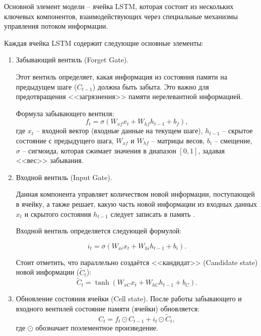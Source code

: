 \documentclass[bachelor, och, coursework]{SCWorks}
\begin{document}
  Основной элемент модели -- ячейка LSTM, которая состоит из нескольких ключевых компонентов, взаимодействующих через специальные механизмы управления 
  потоком информации.

  Каждая ячейка LSTM содержит следующие основные элементы:  

  \begin{enumerate}
    
    \item Забывающий вентиль (Forget Gate).
    
    Этот вентиль определяет, какая информация из состояния памяти на предыдущем шаге ($C_{t-1}$) должна быть забыта.  
    Это важно для предотвращения <<загрязнения>> памяти нерелевантной информацией.  
    
    Формула забывающего вентиля:  
    \begin{equation}      
        f_t = \sigma(W_{xf}x_t + W_{hf}h_{t-1} + b_f),
    \end{equation}
     где $x_t$ -- входной вектор (входные данные на текущем шаге), $h_{t-1}$ -- скрытое состояние с предыдущего шага, $W_{xf}$ и $W_{hf}$ -- матрицы весов,
     $b_i$ -- смещение, $\sigma$ -- сигмоида, которая сжимает значения в диапазон $[0, 1]$, задавая <<вес>> забывания.

    \item Входной вентиль (Input Gate).
    
    Данная компонента управляет количеством новой информации, поступающей в ячейку, а также решает, 
    какую часть новой информации из входных данных \(x_t\) и скрытого состояния \(h_{t-1}\) 
    следует записать в память \cite{lstm2}.

    Входной вентиль определяется следующей формулой:  

    \begin{equation}
        i_t = \sigma(W_{xi}x_t + W_{hi}h_{t-1} + b_i).
    \end{equation}
    
    Стоит отметить, что параллельно создаётся <<кандидат>> (Candidate state) новой информации (\(\tilde{C}_t\)):  
    \begin{equation}
      \tilde{C}_t = \tanh(W_{xC}x_t + W_{hC}h_{t-1} + b_C).      
    \end{equation}

    \item Обновление состояния ячейки (Cell state). 
    После работы забывающего и входного вентилей состояние памяти (ячейки) обновляется:  
    \begin{equation}
        C_t = f_t \odot C_{t-1} + i_t \odot \tilde{C}_t,
    \end{equation}
    где \(\odot\) обозначает поэлементное произведение.  
    

\end{enumerate}
\end{document}

